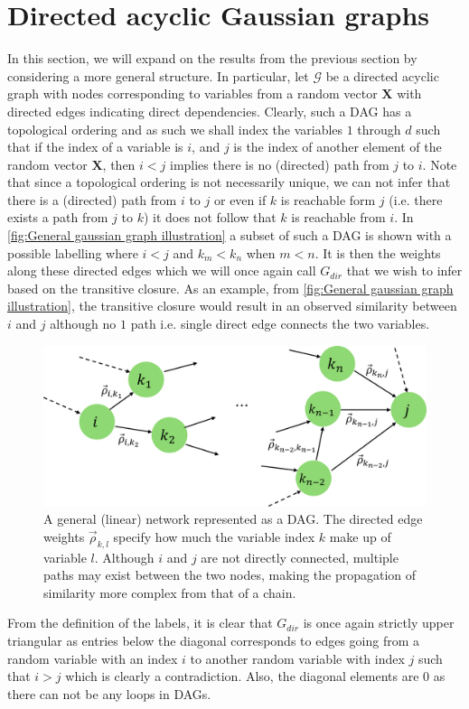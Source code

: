 \documentclass[../Thesis.tex]{subfiles}
\begin{document}
\newpage
\section{Directed acyclic Gaussian graphs}\label{sec:General Gaussian graph}
In this section, we will expand on the results from the previous section by considering a more general structure. In particular, let $\mathcal{G}$ be a directed acyclic graph with nodes corresponding to variables from a random vector $\boldsymbol X$ with directed edges indicating direct dependencies. Clearly, such a DAG has a topological ordering and as such we shall index the variables $1$ through $d$ such that if the index of a variable is $i$, and $j$ is the index of another element of the random vector $\boldsymbol X$, then $i < j$ implies there is no (directed) path from $j$ to $i$. Note that since a topological ordering is not necessarily unique, we can not infer that there is a (directed) path from $i$ to $j$ or even if $k$ is reachable form $j$ (i.e. there exists a path from $j$ to $k$) it does not follow that $k$ is reachable from $i$. In \autoref{fig:General gaussian graph illustration} a subset of such a DAG is shown with a possible labelling where $i < j$ and $k_m < k_n$ when $m < n$. It is then the weights along these directed edges which we will once again call $G_{dir}$ that we wish to infer based on the transitive closure. As an example, from \autoref{fig:General gaussian graph illustration}, the transitive closure would result in an observed similarity between $i$ and $j$ although no $1$ path i.e. single direct edge connects the two variables.
\begin{figure}[ht]
    \centering
    \includegraphics[width = .7\linewidth]{figures/ND examples/Gaussian graph illustration.png}
    \caption{A general (linear) network represented as a DAG. The directed edge weights $\vec{\rho}_{k,l}$ specify how much the variable index $k$ make up of variable $l$. Although $i$ and $j$ are not directly connected, multiple paths may exist between the two nodes, making the propagation of similarity more complex from that of a chain.}
    \label{fig:General gaussian graph illustration}
\end{figure}
From the definition of the labels, it is clear that $G_{dir}$ is once again strictly upper triangular as entries below the diagonal corresponds to edges going from a random variable with an index $i$ to another random variable with index $j$ such that $i > j$ which is clearly a contradiction. Also, the diagonal elements are $0$ as there can not be any loops in DAGs.
\end{document}
